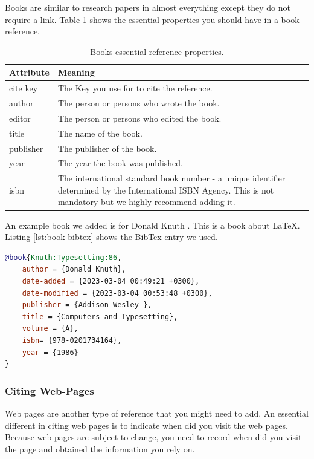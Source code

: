 Books are similar to research papers in almost everything except they do not require a link. Table-\ref{tab:book-properties} shows the essential properties you should have in a book reference.

\begin{table}[H]
    \centering
    \begin{tabular}{p{}p{}}
        \hline\hline
        Attribute      & Meaning \\ \hline\hline
        cite key  & The Key you use for to cite the reference.  \\
        author & The person or persons who wrote the book. \\
        editor & The person or persons who edited the book. \\
        title & The name of the book. \\
        publisher & The publisher of the book. \\
        year & The year the book was published. \\
        isbn & The international standard book number - a unique identifier determined by the International ISBN Agency. This is not mandatory but we highly recommend adding it. \\ \hline
    \end{tabular}
    \caption{Books essential reference properties.}
    \label{tab:book-properties}
\end{table}

An example book we added is for Donald Knuth \cite{Knuth:Typesetting:86}. This is a book about {\LaTeX}. Listing-\ref{lst:book-bibtex} shows the BibTex entry we used.

\begin{lstlisting}[language=BibTex,style=mystyle,caption={Sample BibTex Reference for A Book},label={lst:book-bibtex}]
@book{Knuth:Typesetting:86,
    author = {Donald Knuth},
    date-added = {2023-03-04 00:49:21 +0300},
    date-modified = {2023-03-04 00:53:48 +0300},
    publisher = {Addison-Wesley },
    title = {Computers and Typesetting},
    volume = {A},
    isbn= {978-0201734164},
    year = {1986}
}
\end{lstlisting}

\subsubsection{Citing Web-Pages}

Web pages are another type of reference that you might need to add. An essential different in citing web pages is to indicate when did you visit the web pages. Because web pages are subject to change, you need to record when did you visit the page and obtained the information you rely on.

